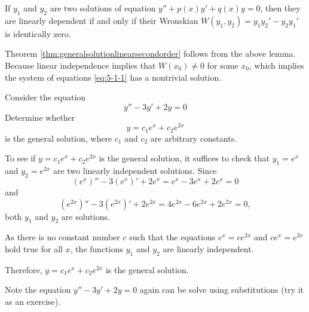 \begin{lemma}
  If $y_{1}$ and $y_{2}$ are two solutions of equation $y'' + p(x) y' + q(x) y = 0$, then they are {\color{red}linearly dependent} if and only if their Wronskian $W(y_{1}, y_{2})=y_{1} y_{2}'-y_{2} y_{1}'$ is {\color{red}identically zero}.
\end{lemma}

Theorem \ref{thm:generalsolutionlinearsecondorder} follows from the above lemma. Because linear independence implies that $W(x_0)\ne 0$ for some $x_0$, which implies the system of equations \eqref{eq:5-1-1} has a nontrivial solution.


\begin{example}
  Consider the equation 
  \[y'' - 3y' + 2y =0\]
  Determine whether
  \[y= c_1 e^x + c_2 e^{2x}\]
  is the general solution, where $c_1$ and $c_2$ are arbitrary constants.
  \end{example}
  \begin{solution}
    To see if $y= c_1 e^x + c_2 e^{2x}$ is the general solution, it suffices to check that $y_1=e^x$ and $y_2=e^{2x}$ are two linearly independent solutions.
    Since 
    \[(e^x)''-3(e^x)'+2e^x=e^x-3e^x+2e^x=0\]
    and
    \[(e^{2x})''-3(e^{2x})'+2e^{2x}=4e^{2x}-6e^{2x}+2e^{2x}=0,\]
    both $y_1$ and $y_2$ are solutions.
  
    As there is no constant number $c$ such that the equations $e^x=ce^{2x}$ and $ce^x=e^{2x}$ hold true for all $x$, the functions $y_1$ and $y_2$ are linearly independent.
  
    Therefore, $y= c_1 e^x + c_2 e^{2x}$ is the general solution.
  \end{solution}
  
  Note the equation $y'' - 3y' + 2y =0$ again can be solve using substitutions (try it as an exercise).
  
